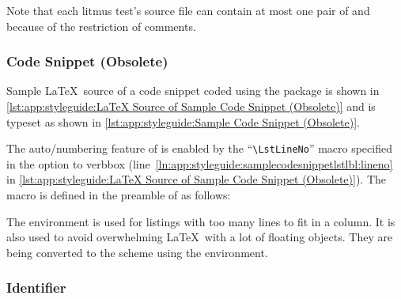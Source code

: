 Note that each litmus test's source file can contain at most one
pair of \co{\\begin[snippet]} and \co{\\end[snippet]} because of
the restriction of comments.

\subsubsection{Code Snippet (Obsolete)}
\label{sec:app:styleguide:Code Snippet (Obsolete)}

Sample \LaTeX\ source of a code snippet coded using
the  package is shown in
\cref{lst:app:styleguide:LaTeX Source of Sample Code Snippet (Obsolete)}
and is typeset as shown in
\cref{lst:app:styleguide:Sample Code Snippet (Obsolete)}.

\begin{listing}[tb]
\begin{fcvlabel}
\end{fcvlabel}
\vspace*{-9pt}
\caption{\LaTeX\ Source of Sample Code Snippet (Obsolete)}
\label{lst:app:styleguide:LaTeX Source of Sample Code Snippet (Obsolete)}
\end{listing}



The auto\-/numbering feature of  is enabled by
the ``\verb|\LstLineNo|'' macro specified in the option to verbbox
(line~\ref{ln:app:styleguide:samplecodesnippetlstlbl:lineno} in
\cref{lst:app:styleguide:LaTeX Source of Sample Code Snippet (Obsolete)}).
The macro is defined in the preamble of 
as follows:

\begin{VerbatimU}
\newcommand{\LstLineNo}
  {\makebox[5ex][r]{\arabic{VerbboxLineNo}\hspace{2ex}}}
\end{VerbatimU}

The  environment is used for listings with too many lines
to fit in a column. It is also used to avoid overwhelming
\LaTeX\ with a lot of floating objects. They are being converted to the
scheme using the  environment.

\subsubsection{Identifier}
\label{sec:app:styleguide:Identifier}

